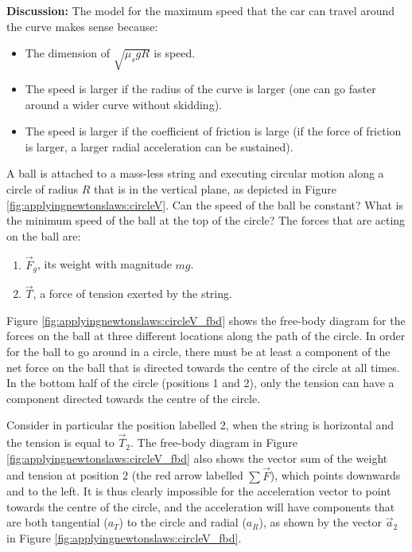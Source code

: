 \begin{example}
\textbf{Discussion:} The model for the maximum speed that the car can travel around the curve makes sense because:
\begin{itemize}
\item The dimension of $\sqrt{\mu_s g R}$ is speed.
\item The speed is larger if the radius of the curve is larger (one can go faster around a wider curve without skidding).
\item The speed is larger if the coefficient of friction is large (if the force of friction is larger, a larger radial acceleration can be sustained).
\end{itemize}
\end{example}

\begin{example}{
A ball is attached to a mass-less string and executing circular motion along a circle of radius $R$ that is in the vertical plane, as depicted in Figure \ref{fig:applyingnewtonslaws:circleV}. Can the speed of the ball be constant? What is the minimum speed of the ball at the top of the circle?}
The forces that are acting on the ball are:
\begin{enumerate}
\item $\vec F_g$, its weight with magnitude $mg$.
\item $\vec T$, a force of tension exerted by the string.
\end{enumerate}
Figure \ref{fig:applyingnewtonslaws:circleV_fbd} shows the free-body diagram for the forces on the ball at three different locations along the path of the circle.
In order for the ball to go around in a circle, there must be at least a component of the net force on the ball that is directed towards the centre of the circle at all times. In the bottom half of the circle (positions 1 and 2), only the tension can have a component directed towards the centre of the circle.

Consider in particular the position labelled 2, when the string is horizontal and the tension is equal to $\vec T_2$. The free-body diagram in Figure \ref{fig:applyingnewtonslaws:circleV_fbd} also shows the vector sum of the weight and tension at position 2 (the red arrow labelled $\sum \vec F$), which points downwards and to the left. It is thus clearly impossible for the acceleration vector to point towards the centre of the circle, and the acceleration will have components that are both tangential ($a_T$) to the circle and radial ($a_R$), as shown by the vector $\vec a_2$ in Figure \ref{fig:applyingnewtonslaws:circleV_fbd}.


\end{example}

